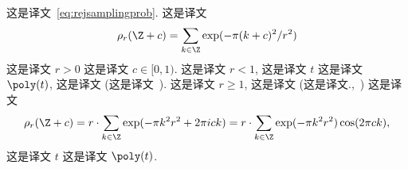 这是译文~\eqref{eq:rejsamplingprob}. 这是译文  \[
\rho_r(\Z+c) = \sum_{k \in \Z} \exp(-\pi (k+c)^2 / r^2)
\]  这是译文 $r>0$ 这是译文 $c \in [0,1)$. 这是译文 $r<1$, 这是译文 $t$ 这是译文 $\poly(t)$, 这是译文 (这是译文~\cite[Section 1.4]{LovaszBook}). 这是译文 $r \ge 1$, 这是译文 (这是译文.,~\cite[Lemma 2.8]{DBLP:journals/siamcomp/MicciancioR07}) 这是译文 \[
\rho_r(\Z+c) = r \cdot \sum_{k \in \Z} \exp(-\pi k^2 r^2 + 2 \pi i c k) = r \cdot \sum_{k \in \Z} \exp(-\pi k^2 r^2) \cos(2 \pi c k),
\]  这是译文 $t$ 这是译文 $\poly(t)$.


